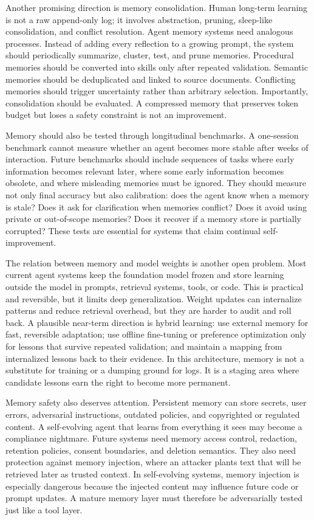 Another promising direction is memory consolidation. Human long-term learning is not a raw append-only log; it involves abstraction, pruning, sleep-like consolidation, and conflict resolution. Agent memory systems need analogous processes. Instead of adding every reflection to a growing prompt, the system should periodically summarize, cluster, test, and prune memories. Procedural memories should be converted into skills only after repeated validation. Semantic memories should be deduplicated and linked to source documents. Conflicting memories should trigger uncertainty rather than arbitrary selection. Importantly, consolidation should be evaluated. A compressed memory that preserves token budget but loses a safety constraint is not an improvement.

Memory should also be tested through longitudinal benchmarks. A one-session benchmark cannot measure whether an agent becomes more stable after weeks of interaction. Future benchmarks should include sequences of tasks where early information becomes relevant later, where some early information becomes obsolete, and where misleading memories must be ignored. They should measure not only final accuracy but also calibration: does the agent know when a memory is stale? Does it ask for clarification when memories conflict? Does it avoid using private or out-of-scope memories? Does it recover if a memory store is partially corrupted? These tests are essential for systems that claim continual self-improvement.

The relation between memory and model weights is another open problem. Most current agent systems keep the foundation model frozen and store learning outside the model in prompts, retrieval systems, tools, or code. This is practical and reversible, but it limits deep generalization. Weight updates can internalize patterns and reduce retrieval overhead, but they are harder to audit and roll back. A plausible near-term direction is hybrid learning: use external memory for fast, reversible adaptation; use offline fine-tuning or preference optimization only for lessons that survive repeated validation; and maintain a mapping from internalized lessons back to their evidence. In this architecture, memory is not a substitute for training or a dumping ground for logs. It is a staging area where candidate lessons earn the right to become more permanent.

Memory safety also deserves attention. Persistent memory can store secrets, user errors, adversarial instructions, outdated policies, and copyrighted or regulated content. A self-evolving agent that learns from everything it sees may become a compliance nightmare. Future systems need memory access control, redaction, retention policies, consent boundaries, and deletion semantics. They also need protection against memory injection, where an attacker plants text that will be retrieved later as trusted context. In self-evolving systems, memory injection is especially dangerous because the injected content may influence future code or prompt updates. A mature memory layer must therefore be adversarially tested just like a tool layer.

